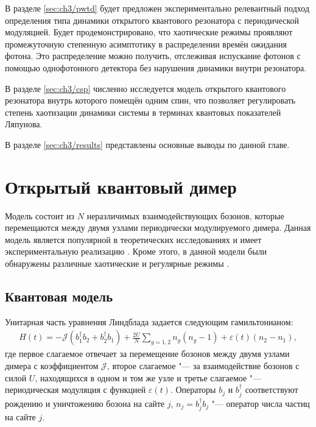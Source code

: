 В разделе \cref{sec:ch3/pwtd} будет предложен экспериментально релевантный подход определения типа динамики открытого квантового резонатора с периодической модуляцией. Будет продемонстрировано, что хаотические режимы проявляют промежуточную степенную асимптотику в распределении времён ожидания фотона. Это распределение можно получить, отслеживая испускание фотонов с помощью однофотонного детектора без нарушения динамики внутри резонатора.

В разделе \cref{sec:ch3/csp} численно исследуется модель открытого квантового резонатора внутрь которого помещён одним спин, что позволяет регулировать степень хаотизации динамики системы в терминах квантовых показателей Ляпунова.

В разделе \cref{sec:ch3/results} представлены основные выводы по данной главе.

\section{Открытый квантовый димер}\label{sec:ch3/dimer}
Модель состоит из \(N\) неразличимых взаимодействующих бозонов, которые перемещаются между двумя узлами периодически модулируемого димера. 
Данная модель является популярной в теоретических исследованиях \cite{Vardi2001, Trimborn2008, Poletti2012} и имеет экспериментальную реализацию \cite{Gross2010, Tomkovic2017}. Кроме этого, в данной модели были обнаружены различные хаотические и регулярные режимы \cite{Hartmann2017, Ivanchenko2017, Carlo2017, Wang2018}. 

\subsection{Квантовая модель}\label{subsec:ch3/dimer/quantum}

Унитарная часть уравнения Линдблада  задается следующим гамильтонианом:
\begin{equation}
	\label{eq:dimer_H}
	\begin{gathered}
		H(t) = -\mathcal{J} \left(b^\dagger_1 b_2 + b^\dagger_2 b_1\right) + \frac{2 U}{N} \sum_{g=1,2} n_g \left(n_g - 1\right) + \varepsilon(t) \left(n_2 - n_1\right),
	\end{gathered}
\end{equation}
где первое слагаемое отвечает за перемещение бозонов между двумя узлами димера с коэффициентом \(\mathcal{J}\), второе слагаемое "--- за взаимодействие бозонов с силой \(U\), находящихся в  одном и том же узле и третье слагаемое "--- периодическая модуляция с функцией \(\varepsilon(t)\). 
Операторы \(b_j\) и \(b^\dagger_j\) соответствуют рождению и уничтожению бозона на сайте \(j\), \(n_j = b^\dagger_j b_j\) "--- оператор числа частиц на сайте \(j\).

